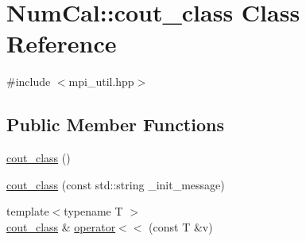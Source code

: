 \hypertarget{classNumCal_1_1cout__class}{\section{Num\+Cal\+:\+:cout\+\_\+class Class Reference}
\label{classNumCal_1_1cout__class}
}


{\ttfamily \#include $<$mpi\+\_\+util.\+hpp$>$}

\subsection*{Public Member Functions}
\begin{DoxyCompactItemize}
\item 
\hyperlink{classNumCal_1_1cout__class_ad848c9f74dc49bca9571c4986565b02e}{cout\+\_\+class} ()
\item 
\hyperlink{classNumCal_1_1cout__class_aac59fc956b73b015ca201943b3487ebd}{cout\+\_\+class} (const std\+::string \+\_\+init\+\_\+message)
\item 
{\footnotesize template$<$typename T $>$ }\\\hyperlink{classNumCal_1_1cout__class}{cout\+\_\+class} \& \hyperlink{classNumCal_1_1cout__class_a085783cf0ce281745f08a7eead1dc071}{operator$<$$<$} (const T \&v)
\end{DoxyCompactItemize}


